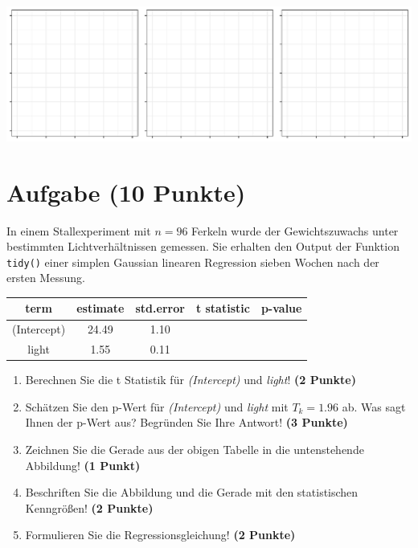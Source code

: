 \documentclass[a4paper, 10pt]{scrartcl}\usepackage[]{graphicx}\usepackage[]{color}
\makeatletter
\def\maxwidth{ %
  \ifdim\Gin@nat@width>\linewidth
    \linewidth
  \else
    \Gin@nat@width
  \fi
}
\makeatother
\begin{document}
{\centering \includegraphics[width=\maxwidth]{img/regression-01-1} 

}



 
\clearpage

\section{Aufgabe \hfill (10 Punkte)}



In einem Stallexperiment mit $n = 96$ Ferkeln wurde der
Gewichtszuwachs unter bestimmten Lichtverh{\"a}ltnissen gemessen. Sie erhalten
den \Rlogo Output der Funktion \texttt{tidy()} einer simplen Gaussian linearen
Regression sieben Wochen nach der ersten Messung.

\begin{table}[!h]
\centering\begingroup\fontsize{14}{16}\selectfont

\begin{tabular}{ccccc}
\toprule
term & estimate & std.error & t statistic & p-value\\
\midrule
(Intercept) & 24.49 & 1.10 &  & \\
light & 1.55 & 0.11 &  & \\
\bottomrule
\end{tabular}
\endgroup{}
\end{table}



\begin{enumerate}
\item Berechnen Sie die t Statistik f{\"u}r \textit{(Intercept)} und
  \textit{light}! \textbf{(2 Punkte)}
\item Sch{\"a}tzen Sie den p-Wert f{\"u}r \textit{(Intercept)} und
  \textit{light} mit $T_k = 1.96$ ab. Was sagt Ihnen der p-Wert aus?
  Begr{\"u}nden Sie Ihre Antwort! \textbf{(3 Punkte)}
\item Zeichnen Sie die Gerade aus der obigen Tabelle in die untenstehende
  Abbildung! \textbf{(1 Punkt)}
\item Beschriften Sie die Abbildung und die Gerade mit den statistischen
  Kenngr{\"o}{\ss}en! \textbf{(2 Punkte)}
\item Formulieren Sie die Regressionsgleichung! \textbf{(2 Punkte)}
\end{enumerate}
\end{document}
